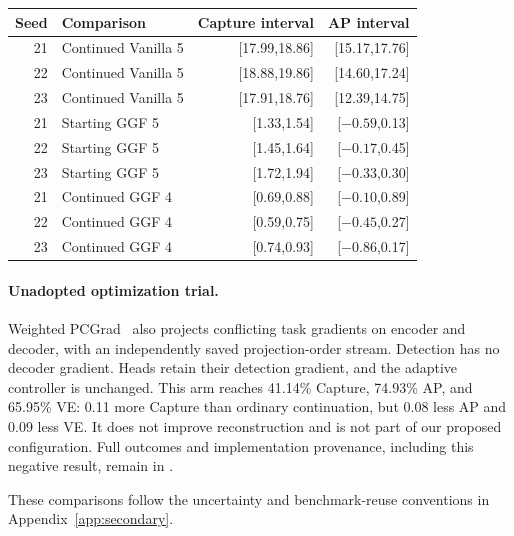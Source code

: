 \begin{agfresulttable}
\caption{Ordinary five-direction GGF gain intervals on test: conditional
95\% paired image intervals, in percentage points. Each uses 200 draws.}
\label{tab:continuation5-intervals}
\begin{tabular}{@{}rlrr@{}}\hline
Seed & Comparison & Capture interval & AP interval\\\hline
21 & Continued Vanilla 5 &[17.99,18.86]&[15.17,17.76]\\
22 & Continued Vanilla 5 &[18.88,19.86]&[14.60,17.24]\\
23 & Continued Vanilla 5 &[17.91,18.76]&[12.39,14.75]\\\hline
21 & Starting GGF 5 &[1.33,1.54]&[$-0.59$,0.13]\\
22 & Starting GGF 5 &[1.45,1.64]&[$-0.17$,0.45]\\
23 & Starting GGF 5 &[1.72,1.94]&[$-0.33$,0.30]\\\hline
21 & Continued GGF 4 &[0.69,0.88]&[$-0.10$,0.89]\\
22 & Continued GGF 4 &[0.59,0.75]&[$-0.45$,0.27]\\
23 & Continued GGF 4 &[0.74,0.93]&[$-0.86$,0.17]\\\hline
\end{tabular}\end{agfresulttable}



\paragraph{Unadopted optimization trial.}
Weighted PCGrad~\citep{yu2020pcgrad} also projects conflicting task gradients
on encoder and decoder, with an independently saved projection-order stream.
Detection has no decoder gradient. Heads retain their detection gradient,
and the adaptive controller is unchanged. This arm reaches 41.14\% Capture,
74.93\% AP, and 65.95\% VE: 0.11 more Capture than ordinary continuation,
but 0.08 less AP and 0.09 less VE. It does not improve reconstruction and
is not part of our proposed configuration. Full outcomes and implementation
provenance, including this negative result, remain in
.

These comparisons follow the uncertainty and benchmark-reuse conventions
in Appendix~\ref{app:secondary}.

